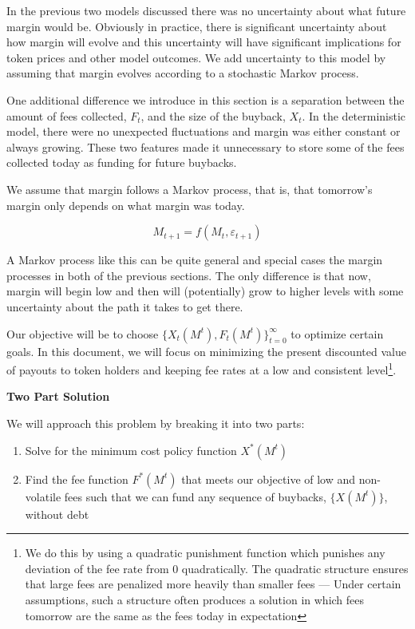 
In the previous two models discussed there was no uncertainty about what future margin would be.
Obviously in practice, there is significant uncertainty about how margin will evolve and this
uncertainty will have significant implications for token prices and other model outcomes. We add
uncertainty to this model by assuming that margin evolves according to a stochastic Markov process.

One additional difference we introduce in this section is a separation between the amount of fees
collected, $F_t$, and the size of the buyback, $X_t$. In the deterministic model, there were no
unexpected fluctuations and margin was either constant or always growing. These two features made it
unnecessary to store some of the fees collected today as funding for future buybacks.

We assume that margin follows a Markov process, that is, that tomorrow's margin only depends on what
margin was today.

$$M_{t+1} = f(M_t, \varepsilon_{t+1})$$

A Markov process like this can be quite general and special cases the margin processes in both of
the previous sections. The only difference is that now, margin will begin low and then will
(potentially) grow to higher levels with some uncertainty about the path it takes to get there.

Our objective will be to choose $\{X_t(M^t), F_t(M^t)\}_{t=0}^{\infty}$ to optimize certain goals.
In this document, we will focus on minimizing the present discounted value of payouts to token
holders and keeping fee rates at a low and consistent level\footnote{We do this by using a quadratic
punishment function which punishes any deviation of the fee rate from 0 quadratically. The quadratic
structure ensures that large fees are penalized more heavily than smaller fees --- Under certain
assumptions, such a structure often produces a solution in which fees tomorrow are the same as the
fees today in expectation}.

\textbf{Two Part Solution}

We will approach this problem by breaking it into two parts:

\begin{enumerate}
  \item Solve for the minimum cost policy function $X^*(M^t)$
  \item Find the fee function $F^*(M^t)$ that meets our objective of low and non-volatile fees such
        that we can fund any sequence of buybacks, $\{X(M^t)\}$, without debt
\end{enumerate}

